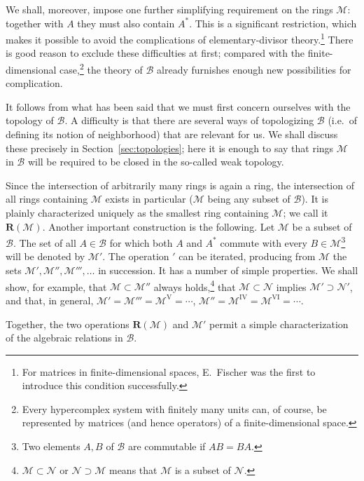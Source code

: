 \documentclass[
  paper=b5,
  twoside=true,
  fontsize=13pt,
  headings=normal,
  bookmarkpackage=false
]{scrartcl}
\theoremstyle{definition}
\newcommand{\GeneratedRing}{\boldsymbol{R}}
\begin{document}
We shall, moreover, impose one further simplifying requirement on the rings
$\mathcal M$: together with $A$ they must also contain $A^*$. This is a
significant restriction, which makes it possible to avoid the complications
of elementary-divisor theory.\footnote{\label{fn:14}For matrices in finite-dimensional
spaces, E.~Fischer was the first to introduce this condition successfully.}
There is good reason to exclude these difficulties at first; compared with
the finite-dimensional case,\footnote{\label{fn:15}Every hypercomplex system with
finitely many units can, of course, be represented by matrices (and hence
operators) of a finite-dimensional space.} the theory of $\mathcal B$
already furnishes enough new possibilities for complication.

It follows from what has been said that we must first concern ourselves
with the topology of $\mathcal B$. A difficulty is that there are several
ways of topologizing $\mathcal B$ (i.e.\ of defining its notion of
neighborhood) that are relevant for us. We shall discuss these precisely in
Section~\ref{sec:topologies}; here it is enough to say that rings
$\mathcal M$ in $\mathcal B$ will be required to be closed in the
so-called weak topology.

Since the intersection of arbitrarily many rings is again a ring, the
intersection of all rings containing $\mathcal M$ exists in particular
($\mathcal M$ being any subset of $\mathcal B$). It is plainly
characterized uniquely as the smallest ring containing $\mathcal M$; we
call it $\GeneratedRing (\mathcal M)$. Another important construction is the following.
Let $\mathcal M$ be a subset of $\mathcal B$. The set of all
$A\in\mathcal B$ for which both $A$ and $A^*$ commute with every
$B\in\mathcal M$\footnote{\label{fn:16}Two elements $A,B$ of $\mathcal B$ are
commutable if $AB=BA$.} will be denoted by $\mathcal M'$. The operation
$'$ can be iterated, producing from $\mathcal M$ the sets
$\mathcal M',\mathcal M'',\mathcal M''',\ldots$ in succession.
It has a number of simple properties. We shall show, for example, that
$\mathcal M\subset\mathcal M''$ always holds,\footnote{\label{fn:17}%
$\mathcal M\subset\mathcal N$ or $\mathcal N\supset\mathcal M$
means that $\mathcal M$ is a subset of $\mathcal N$.}
that $\mathcal M\subset\mathcal N$ implies $\mathcal M'\supset\mathcal N'$,
and that, in general, $\mathcal M'=\mathcal M'''=\mathcal M^{\mathrm V}=\cdots$,
$\mathcal M''=\mathcal M^{\mathrm{IV}}=\mathcal M^{\mathrm{VI}}=\cdots$.

Together, the two operations $\GeneratedRing (\mathcal M)$ and $\mathcal M'$ permit a
simple characterization of the algebraic relations in $\mathcal B$.
\end{document}
